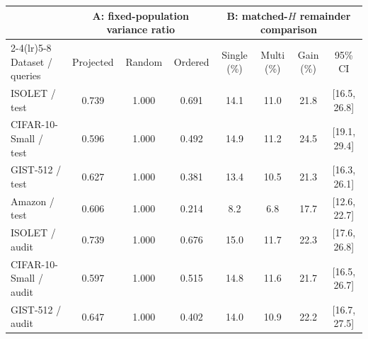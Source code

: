 \begin{tabular}{lccccccc}
\toprule
& \multicolumn{3}{c}{A: fixed-population variance ratio} & \multicolumn{4}{c}{B: matched-$H$ remainder comparison} \\
\cmidrule(lr){2-4}\cmidrule(lr){5-8}
Dataset / queries & Projected & Random & Ordered & Single (\%) & Multi (\%) & Gain (\%) & 95\% CI \\
\midrule
ISOLET / test & 0.739 & 1.000 & 0.691 & 14.1 & 11.0 & 21.8 & [16.5, 26.8] \\
CIFAR-10-Small / test & 0.596 & 1.000 & 0.492 & 14.9 & 11.2 & 24.5 & [19.1, 29.4] \\
GIST-512 / test & 0.627 & 1.000 & 0.381 & 13.4 & 10.5 & 21.3 & [16.3, 26.1] \\
Amazon / test & 0.606 & 1.000 & 0.214 & 8.2 & 6.8 & 17.7 & [12.6, 22.7] \\
\midrule
ISOLET / audit & 0.739 & 1.000 & 0.676 & 15.0 & 11.7 & 22.3 & [17.6, 26.8] \\
CIFAR-10-Small / audit & 0.597 & 1.000 & 0.515 & 14.8 & 11.6 & 21.7 & [16.5, 26.7] \\
GIST-512 / audit & 0.647 & 1.000 & 0.402 & 14.0 & 10.9 & 22.2 & [16.7, 27.5] \\
\bottomrule
\end{tabular}
